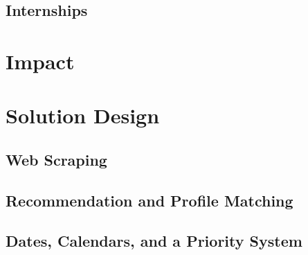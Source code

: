 \documentclass[english]{proposalnsf}
\begin{document}
	
	\subsection{Internships}
	
	\section{Impact}
	\label{impact}
	
	
	\section{Solution Design}
	\label{solution-design}
	
		\subsection{Web Scraping}
		
		\subsection{Recommendation and Profile Matching}
		
		\subsection{Dates, Calendars, and a Priority System}
	
\end{document}
